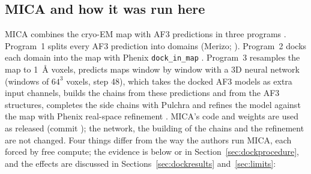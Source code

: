 \subsection{MICA and how it was run here}\label{sec:mica}
MICA combines the cryo-EM map with AF3 predictions in three programs \citep{gyawali2025mica}. Program~1 splits every AF3 prediction into domains (Merizo; \citealp{lau2023merizo}). Program~2 docks each domain into the map with Phenix \texttt{dock\_in\_map} \citep{liebschner2019phenix}. Program~3 resamples the map to 1~\AA{} voxels, predicts maps window by window with a 3D neural network (windows of $64^3$ voxels, step 48), which takes the docked AF3 models as extra input channels, builds the chains from these predictions and from the AF3 structures, completes the side chains with Pulchra \citep{rotkiewicz2008pulchra} and refines the model against the map with Phenix real-space refinement \citep{afonine2018rsr}. MICA's code and weights are used as released (commit \texttt{\CommitMica}); the network, the building of the chains and the refinement are not changed. Four things differ from the way the authors run MICA, each forced by free compute; the evidence is below or in Section~\ref{sec:dockprocedure}, and the effects are discussed in Sections~\ref{sec:dockresults} and~\ref{sec:limits}:
